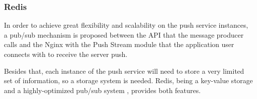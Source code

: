 \subsubsection{Redis}

In order to achieve great flexibility and scalability on the push service instances, a pub/sub mechanism is proposed between the API that the message producer calls and the Nginx with the Push Stream module that the application user connects with to receive the server push.

Besides that, each instance of the push service will need to store a very limited set of information, so a storage system is needed. Redis, being a key-value storage and a highly-optimized pub/sub system \cite{gascon2015dynamoth}, provides both features.
